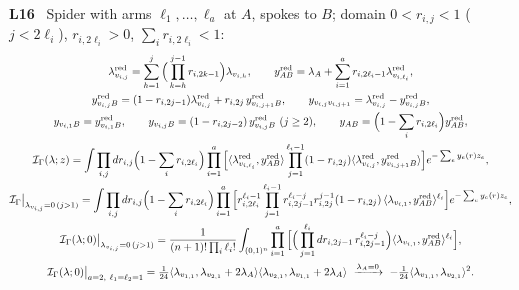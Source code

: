 \documentclass[10pt,a4paper]{article}
\numberwithin{equation}{section}
\newcommand{\cI}{\mathcal I}
\newcommand{\br}[1]{\langle #1\rangle}
\newcommand{\LL}[2]{\textsf{L}(#1){\scriptsize\,\texttt{#2}}}
\newcommand{\LT}[3]{\textsf{L}\,#1\,#2{\scriptsize\,\texttt{#3}}}
\newcommand{\rid}[1]{\par\medskip\noindent\textbf{#1}\ }
\newcommand{\ptr}[2]{\par\nopagebreak{\footnotesize\raggedleft[\,#1\ $\mid$\ #2\,]\par}}
\newcommand{\st}[1]{\textsf{#1}}
\begin{document}
\rid{L16} Spider with arms $\ell_1,\dots,\ell_a$ at $A$, spokes to $B$; domain $0<r_{i,j}<1$ ($j<2\ell_i$), $r_{i,2\ell_i}>0$, $\sum_ir_{i,2\ell_i}<1$:
\begin{gather*}
\lambda^{\rm red}_{v_{i,j}}=\sum_{h=1}^j\Big(\prod_{k=h}^{j-1}r_{i,2k-1}\Big)\lambda_{v_{i,h}},\qquad y^{\rm red}_{AB}=\lambda_A+\sum_{i=1}^ar_{i,2\ell_i-1}\lambda^{\rm red}_{v_{i,\ell_i}},\\
y^{\rm red}_{v_{i,j}B}=(1-r_{i,2j-1})\lambda^{\rm red}_{v_{i,j}}+r_{i,2j}\,y^{\rm red}_{v_{i,j+1}B},\qquad y_{v_{i,j}v_{i,j+1}}=\lambda^{\rm red}_{v_{i,j}}-y^{\rm red}_{v_{i,j}B},\\
y_{v_{i,1}B}=y^{\rm red}_{v_{i,1}B},\qquad y_{v_{i,j}B}=(1-r_{i,2j-2})\,y^{\rm red}_{v_{i,j}B}\ (j\ge2),\qquad y_{AB}=\Big(1-\sum_ir_{i,2\ell_i}\Big)y^{\rm red}_{AB},\\
\cI_\Gamma(\lambda;z)=\int\prod_{i,j}dr_{i,j}\Big(1-\sum_ir_{i,2\ell_i}\Big)\prod_{i=1}^a\Big[\br{\lambda^{\rm red}_{v_{i,\ell_i}},y^{\rm red}_{AB}}\prod_{j=1}^{\ell_i-1}(1-r_{i,2j})\br{\lambda^{\rm red}_{v_{i,j}},y^{\rm red}_{v_{i,j+1}B}}\Big]e^{-\sum_ey_e(r)z_e},\\
\cI_\Gamma\big|_{\lambda_{v_{i,j}}=0\,(j>1)}=\int\prod_{i,j}dr_{i,j}\Big(1-\sum_ir_{i,2\ell_i}\Big)\prod_{i=1}^a\Big[r_{i,2\ell_i}^{\ell_i-1}\prod_{j=1}^{\ell_i-1}r_{i,2j-1}^{\ell_i-j}r_{i,2j}^{j-1}(1-r_{i,2j})\,\br{\lambda_{v_{i,1}},y^{\rm red}_{AB}}^{\ell_i}\Big]e^{-\sum_ey_e(r)z_e},\\
\cI_\Gamma(\lambda;0)\big|_{\lambda_{v_{i,j}}=0\,(j>1)}=\frac1{(n+1)!\prod_i\ell_i!}\int_{(0,1)^n}\prod_{i=1}^a\Big[\Big(\prod_{j=1}^{\ell_i}dr_{i,2j-1}\,r_{i,2j-1}^{\ell_i-j}\Big)\br{\lambda_{v_{i,1}},y^{\rm red}_{AB}}^{\ell_i}\Big],\\
\cI_\Gamma(\lambda;0)\big|_{a=2,\ \ell_1=\ell_2=1}=\tfrac1{24}\br{\lambda_{v_{1,1}},\lambda_{v_{2,1}}+2\lambda_A}\br{\lambda_{v_{2,1}},\lambda_{v_{1,1}}+2\lambda_A}\ \xrightarrow{\lambda_A=0}\ -\tfrac1{24}\br{\lambda_{v_{1,1}},\lambda_{v_{2,1}}}^2 .
\end{gather*}
\ptr{\LT{Def.}{7.1}{b-00380} \LL{7.1}{eq-1-47}; \LT{Thm}{7.2}{thm-spider-kernel} \LL{7.2}{eq-spiderdomain}, \LL{7.3}{eq-spider-reduced}, \LL{7.4}{eq-1-51}, \LL{7.5}{eq-1-54-general}; \LL{7.10}{eq-spider-qn-sources}, \LL{7.11}{eq-1-54}$=$\LL{2.43}{eq-sum-spider-kernel-explicit}, \LL{7.12}{eq-spider-zero-displacement}, \LL{7.13}{eq-spider-two-arm-value}}{\st{P}; (7.13) from (7.12) \st{E}; (7.13) equals $f_{\text{bitriangle}}[\lambda_1,\lambda_2,\lambda_3;0,0]$ of \textsf{Op} (\path{4dDiffPaper.tex} l.~2337)}
\end{document}
